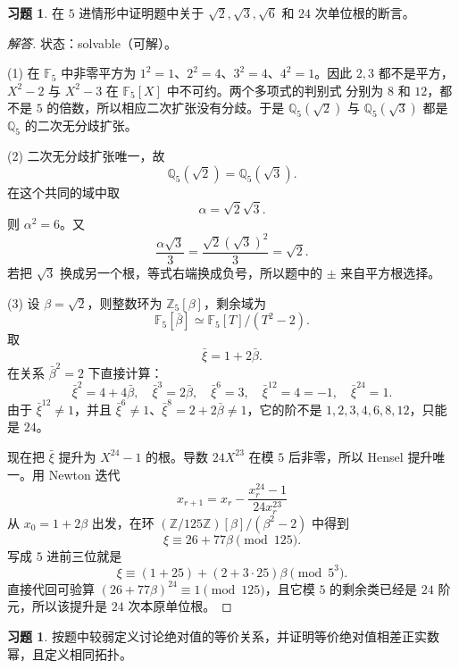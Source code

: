 \documentclass[11pt,a4paper,openany]{ctexbook}
\numberwithin{equation}{chapter}
\newcommand{\Q}{\mathbb{Q}}
\newcommand{\Z}{\mathbb{Z}}
\newcommand{\F}{\mathbb{F}}
\theoremstyle{plain}
\theoremstyle{definition}
\newtheorem{exercise}[theorem]{习题}
\theoremstyle{remark}
\begin{document}
\begin{exercise}
在 $5$ 进情形中证明题中关于 $\sqrt2,\sqrt3,\sqrt6$ 和 $24$ 次单位根的断言。
\end{exercise}

\begin{proof}[解答]
状态：solvable（可解）。

(1) 在 $\F_5$ 中非零平方为 $1^2=1$、$2^2=4$、$3^2=4$、$4^2=1$。因此
$2,3$ 都不是平方，$X^2-2$ 与 $X^2-3$ 在 $\F_5[X]$ 中不可约。两个多项式的判别式
分别为 $8$ 和 $12$，都不是 $5$ 的倍数，所以相应二次扩张没有分歧。于是
$\Q_5(\sqrt2)$ 与 $\Q_5(\sqrt3)$ 都是 $\Q_5$ 的二次无分歧扩张。

(2) 二次无分歧扩张唯一，故
\[
\Q_5(\sqrt2)=\Q_5(\sqrt3).
\]
在这个共同的域中取
\[
\alpha=\sqrt2\sqrt3.
\]
则 $\alpha^2=6$。又
\[
\frac{\alpha\sqrt3}{3}
=\frac{\sqrt2(\sqrt3)^2}{3}
=\sqrt2.
\]
若把 $\sqrt3$ 换成另一个根，等式右端换成负号，所以题中的 $\pm$ 来自平方根选择。

(3) 设 $\beta=\sqrt2$，则整数环为 $\Z_5[\beta]$，剩余域为
\[
\F_5[\bar\beta]\simeq \F_5[T]/(T^2-2).
\]
取
\[
\bar\xi=1+2\bar\beta .
\]
在关系 $\bar\beta^2=2$ 下直接计算：
\[
\bar\xi^2=4+4\bar\beta,\quad
\bar\xi^3=2\bar\beta,\quad
\bar\xi^6=3,\quad
\bar\xi^{12}=4=-1,\quad
\bar\xi^{24}=1.
\]
由于 $\bar\xi^{12}\ne1$，并且 $\bar\xi^6\ne1$、$\bar\xi^8=2+2\bar\beta\ne1$，它的阶不是
$1,2,3,4,6,8,12$，只能是 $24$。

现在把 $\bar\xi$ 提升为 $X^{24}-1$ 的根。导数 $24X^{23}$ 在模 $5$ 后非零，所以 Hensel
提升唯一。用 Newton 迭代
\[
x_{r+1}=x_r-\frac{x_r^{24}-1}{24x_r^{23}}
\]
从 $x_0=1+2\beta$ 出发，在环 $(\Z/125\Z)[\beta]/(\beta^2-2)$ 中得到
\[
\xi\equiv 26+77\beta \pmod{125}.
\]
写成 $5$ 进前三位就是
\[
\xi\equiv (1+25)+(2+3\cdot25)\beta \pmod{5^3}.
\]
直接代回可验算 $(26+77\beta)^{24}\equiv1\pmod{125}$，且它模 $5$ 的剩余类已经是
$24$ 阶元，所以该提升是 $24$ 次本原单位根。
\end{proof}

\begin{exercise}
按题中较弱定义讨论绝对值的等价关系，并证明等价绝对值相差正实数幂，且定义相同拓扑。
\end{exercise}
\end{document}
